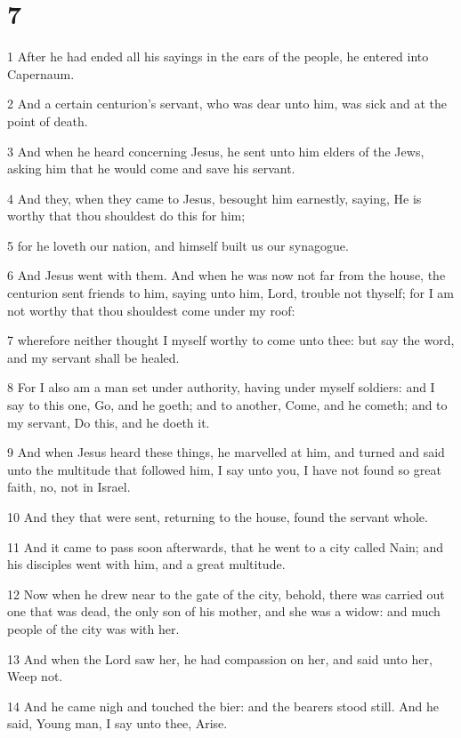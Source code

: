 \chapter{7}

\par 1 After he had ended all his sayings in the ears of the people, he entered into Capernaum.
\par 2 And a certain centurion's servant, who was dear unto him, was sick and at the point of death.
\par 3 And when he heard concerning Jesus, he sent unto him elders of the Jews, asking him that he would come and save his servant.
\par 4 And they, when they came to Jesus, besought him earnestly, saying, He is worthy that thou shouldest do this for him;
\par 5 for he loveth our nation, and himself built us our synagogue.
\par 6 And Jesus went with them. And when he was now not far from the house, the centurion sent friends to him, saying unto him, Lord, trouble not thyself; for I am not worthy that thou shouldest come under my roof:
\par 7 wherefore neither thought I myself worthy to come unto thee: but say the word, and my servant shall be healed.
\par 8 For I also am a man set under authority, having under myself soldiers: and I say to this one, Go, and he goeth; and to another, Come, and he cometh; and to my servant, Do this, and he doeth it.
\par 9 And when Jesus heard these things, he marvelled at him, and turned and said unto the multitude that followed him, I say unto you, I have not found so great faith, no, not in Israel.
\par 10 And they that were sent, returning to the house, found the servant whole.
\par 11 And it came to pass soon afterwards, that he went to a city called Nain; and his disciples went with him, and a great multitude.
\par 12 Now when he drew near to the gate of the city, behold, there was carried out one that was dead, the only son of his mother, and she was a widow: and much people of the city was with her.
\par 13 And when the Lord saw her, he had compassion on her, and said unto her, Weep not.
\par 14 And he came nigh and touched the bier: and the bearers stood still. And he said, Young man, I say unto thee, Arise.
